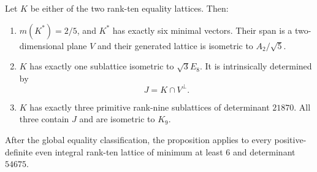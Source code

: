 
\begin{proposition}
\label{prop:intrinsic-rank-ten}
Let $K$ be either of the two rank-ten equality lattices. Then:
\begin{enumerate}
\item $m(K^*)=2/5$, and $K^*$ has exactly six minimal vectors. Their span
      is a two-dimensional plane $V$ and their generated lattice is
      isometric to $A_2/\sqrt5$.
\item $K$ has exactly one sublattice isometric to $\sqrt3E_8$. It is
      intrinsically determined by
      \[
         J=K\cap V^\perp.
      \]
\item $K$ has exactly three primitive rank-nine sublattices of determinant
      $21870$. All three contain $J$ and are isometric to $K_9$.
\end{enumerate}
After the global equality classification, the proposition applies to every
positive-definite even integral rank-ten lattice of minimum at least $6$
and determinant $54675$.
\end{proposition}

